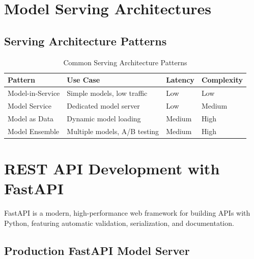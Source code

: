 \section{Model Serving Architectures}

\subsection{Serving Architecture Patterns}

\begin{table}[h]
\centering
\caption{Common Serving Architecture Patterns}
\label{tab:serving_architectures}
\begin{tabular}{|l|l|l|l|}
\hline
\textbf{Pattern} & \textbf{Use Case} & \textbf{Latency} & \textbf{Complexity} \\
\hline
Model-in-Service & Simple models, low traffic & Low & Low \\
Model Service & Dedicated model server & Low & Medium \\
Model as Data & Dynamic model loading & Medium & High \\
Model Ensemble & Multiple models, A/B testing & Medium & High \\
\hline
\end{tabular}
\end{table}

\section{REST API Development with FastAPI}

FastAPI is a modern, high-performance web framework for building APIs with Python, featuring automatic validation, serialization, and documentation.

\subsection{Production FastAPI Model Server}

